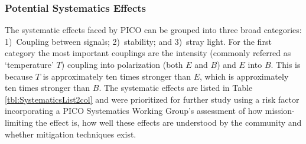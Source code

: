 \documentclass[PICOReport.tex]{subfiles}
\begin{document}





\subsubsection{Potential Systematics Effects}
\label{sec:systematics_list}


The systematic effects faced by PICO can be grouped into three broad categories: 1)~Coupling between signals; 2)~stability; and 3)~stray light. For the first category the most important couplings are the intensity (commonly referred as `temperature' $T$) coupling into polarization (both $E$ and $B$) and $E$ into $B$. This is because $T$ is approximately ten times stronger than $E$, which is approximately ten times stronger than $B$. The systematic effects are listed in Table \ref{tbl:SystematicsList2col} and were prioritized for further study using a risk factor incorporating a PICO Systematics Working Group's assessment of how mission-limiting the effect is, how well these effects are understood by the community and whether mitigation techniques exist.  
\end{document}
